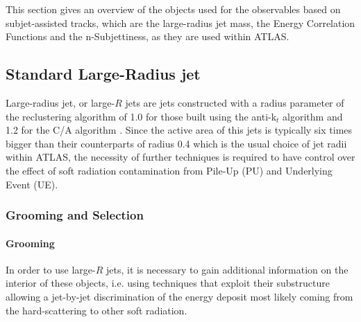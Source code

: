 This section gives an overview of the objects used for the observables based on subjet-assisted tracks, which are the large-radius jet mass, the Energy Correlation Functions and the n-Subjettiness, as they are used within ATLAS.

\subsection{Standard Large-Radius jet}




Large-radius jet, or large-$R$ jets are jets constructed with a radius parameter of the reclustering algorithm of 1.0 for those built using the anti-k$_t$ algorithm and 1.2 for the C/A algorithm \cite{antiktalgo}.
Since the active area of this jets is typically six times bigger than their counterparts of radius 0.4 which is the usual choice of jet radii within ATLAS, the necessity of further techniques is required to have control over the effect of soft radiation contamination from Pile-Up (PU) and Underlying Event (UE).

\subsubsection{Grooming and Selection}

\paragraph{Grooming}
In order to use large-$R$ jets, it is necessary to gain additional information on the interior of these objects, i.e. using techniques that exploit their substructure allowing a jet-by-jet discrimination of the energy deposit most likely coming from the hard-scattering to other soft radiation.

